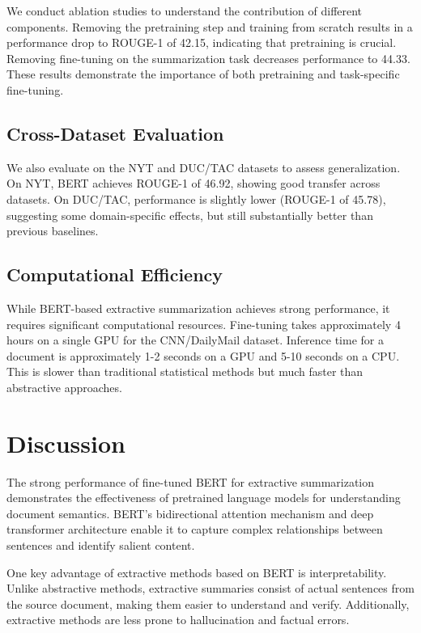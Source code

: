 \documentclass[conference]{IEEEtran}
\begin{document}
We conduct ablation studies to understand the contribution of different components. Removing the pretraining step and training from scratch results in a performance drop to ROUGE-1 of 42.15, indicating that pretraining is crucial. Removing fine-tuning on the summarization task decreases performance to 44.33. These results demonstrate the importance of both pretraining and task-specific fine-tuning.

\subsection{Cross-Dataset Evaluation}

We also evaluate on the NYT and DUC/TAC datasets to assess generalization. On NYT, BERT achieves ROUGE-1 of 46.92, showing good transfer across datasets. On DUC/TAC, performance is slightly lower (ROUGE-1 of 45.78), suggesting some domain-specific effects, but still substantially better than previous baselines.

\subsection{Computational Efficiency}

While BERT-based extractive summarization achieves strong performance, it requires significant computational resources. Fine-tuning takes approximately 4 hours on a single GPU for the CNN/DailyMail dataset. Inference time for a document is approximately 1-2 seconds on a GPU and 5-10 seconds on a CPU. This is slower than traditional statistical methods but much faster than abstractive approaches.

\section{Discussion}

The strong performance of fine-tuned BERT for extractive summarization demonstrates the effectiveness of pretrained language models for understanding document semantics. BERT's bidirectional attention mechanism and deep transformer architecture enable it to capture complex relationships between sentences and identify salient content.

One key advantage of extractive methods based on BERT is interpretability. Unlike abstractive methods, extractive summaries consist of actual sentences from the source document, making them easier to understand and verify. Additionally, extractive methods are less prone to hallucination and factual errors.
\end{document}
